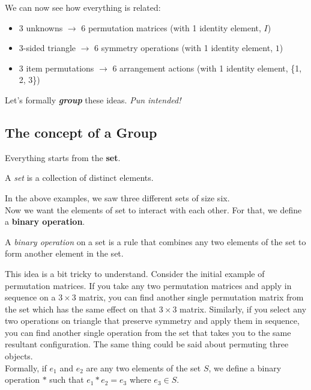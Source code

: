 We can now see how everything is related: 

\begin{itemize}
    \item 3 unknowns $\rightarrow$ 6 permutation matrices (with 1 identity element, $I$)
    \item 3-sided triangle $\rightarrow$ 6 symmetry operations (with 1 identity element, $1$)
    \item 3 item permutations $\rightarrow$ 6 arrangement actions (with 1 identity element, \{1, 2, 3\})
\end{itemize}

Let's formally \textit{\textbf{group}} these ideas. \textit{Pun intended!} 

\subsection{The concept of a Group}
\vspace{3pt}

Everything starts from the \textbf{set}. 

\begin{definition}
    A \textit{set} is a collection of distinct elements.
\end{definition}

In the above examples, we saw three different sets of size six. \\

Now we want the elements of set to interact with each other. For that, we define a \textbf{binary operation}. 

\begin{definition}
    A \textit{binary operation} on a set is a rule that combines any two elements of the set to form another element in the set.     
\end{definition}

This idea is a bit tricky to understand. Consider the initial example of permutation matrices. If you take any two permutation matrices and apply in sequence on a $3 \times 3$ matrix, you can find another single permutation matrix from the set which has the same effect on that $3 \times 3$ matrix. Similarly, if you select any two operations on triangle that preserve symmetry and apply them in sequence, you can find another single operation from the set that takes you to the same resultant configuration. The same thing could be said about permuting three objects. \\

Formally, if $e_1$ and $e_2$ are any two elements of the set $S$, we define a binary operation $*$ such that $e_1*e_2 = e_3$ where $e_3 \in S$. \\


